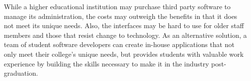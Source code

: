While a higher educational institution may purchase third party software to manage its administration, the costs may outweigh the benefits in that it does not meet its unique needs. Also, the interfaces may be hard to use for older staff members and those that resist change to technology. As an alternative solution, a team of student software developers can create in-house applications that not only meet their college's unique needs, but provides students with valuable work experience by building the skills necessary to make it in the industry post-graduation.